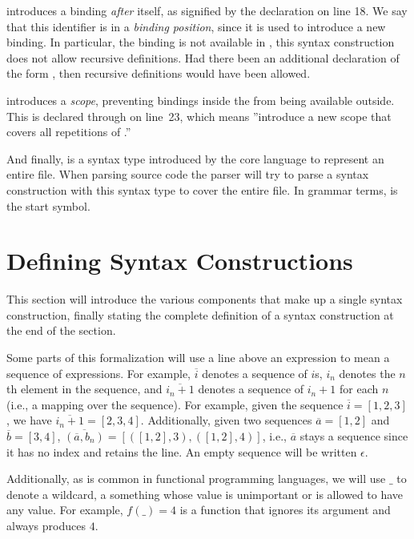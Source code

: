 \documentclass{kththesis}
\begin{document}
 introduces a binding \emph{after} itself, as signified by the  declaration on line 18. We say that this identifier is in a \emph{binding position}, since it is used to introduce a new binding. In particular, the binding is not available in , this syntax construction does not allow recursive definitions. Had there been an additional declaration of the form , then recursive definitions would have been allowed.

 introduces a \emph{scope}, preventing bindings inside the  from being available outside. This is declared through  on line~23, which means ''introduce a new scope that covers all repetitions of .''

And finally,  is a syntax type introduced by the core language to represent an entire file. When parsing source code the parser will try to parse a syntax construction with this syntax type to cover the entire file. In grammar terms,  is the start symbol.

\section{Defining Syntax Constructions} \label{sec:defining-syntax-constructions}

This section will introduce the various components that make up a single syntax construction, finally stating the complete definition of a syntax construction at the end of the section.

Some parts of this formalization will use a line above an expression to mean a sequence of expressions. For example, $\overline{i}$ denotes a sequence of $i$s, $i_n$ denotes the $n$th element in the sequence, and $\overline{i_n + 1}$ denotes a sequence of $i_n + 1$ for each $n$ (i.e., a mapping over the sequence). For example, given the sequence $\overline{i} = [1, 2, 3]$, we have $\overline{i_n + 1} = [2, 3, 4]$. Additionally, given two sequences $\overline{a} = [1, 2]$ and $\overline{b} = [3, 4]$, $\overline{(\overline{a}, b_n)} = [([1, 2], 3), ([1, 2], 4)]$, i.e., $\overline{a}$ stays a sequence since it has no index and retains the line. An empty sequence will be written $\epsilon$.

Additionally, as is common in functional programming languages, we will use $\_$ to denote a wildcard, a something whose value is unimportant or is allowed to have any value. For example, $f(\_) = 4$ is a function that ignores its argument and always produces $4$.
\end{document}
